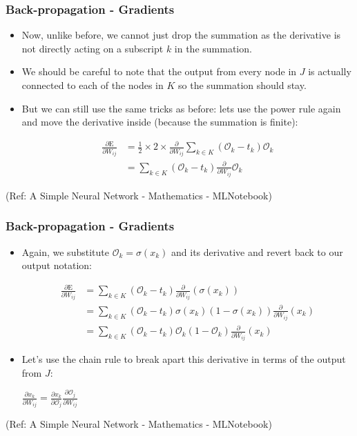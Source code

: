 \begin{frame}[fragile] \frametitle{Back-propagation - Gradients}

\begin{itemize}
\item Now, unlike before, we cannot just drop the summation as the derivative is not directly acting on a subscript $k$ in the 
summation. 
\item We should be careful to note that the output from every node in $J$ is actually connected to each of the nodes in $K$ 
so the summation should stay. 
\item But we can still use the same tricks as before: 
lets use the power rule again and move the derivative inside (because the summation is finite):

\begin{align}
\frac{\partial{\text{E}}}{\partial{W_{ij}}} &=  \frac{1}{2} \times 2 \times  \frac{\partial{}}{\partial{W_{ij}}}   \sum_{k \in K} \left( \mathcal{O}_{k} - t_{k} \right)  \mathcal{O}_{k} \\
&= \sum_{k \in K} \left( \mathcal{O}_{k} - t_{k} \right) \frac{\partial{}}{\partial{W_{ij}}} \mathcal{O}_{k}
 \end{align}
 
\end{itemize}

\tiny{(Ref: A Simple Neural Network - Mathematics - MLNotebook)}
\end{frame}

\begin{frame}[fragile] \frametitle{Back-propagation - Gradients}

\begin{itemize}
\item Again, we substitute $\mathcal{O}_{k} = \sigma( x_{k})$ and its derivative and revert back to our output notation:

\begin{align}
\frac{\partial{\text{E}}}{\partial{W_{ij}}} &= \sum_{k \in K} \left( \mathcal{O}_{k} - t_{k} \right) \frac{\partial{}}{\partial{W_{ij}}} (\sigma(x_{k}) )\\
&= \sum_{k \in K} \left( \mathcal{O}_{k} - t_{k} \right) \sigma(x_{k}) \left( 1 - \sigma(x_{k}) \right) \frac{\partial{}}{\partial{W_{ij}}} (x_{k}) \\
&= \sum_{k \in K} \left( \mathcal{O}_{k} - t_{k} \right) \mathcal{O}_{k} \left( 1 - \mathcal{O}_{k} \right) \frac{\partial{}}{\partial{W_{ij}}} (x_{k})
 \end{align}
 
\item Let’s use the chain rule to break apart this derivative in terms of the output from $J$:

$\frac{\partial{ x_{k}}}{\partial{W_{ij}}} = \frac{\partial{ x_{k}}}{\partial{\mathcal{O}_{j}}}\frac{\partial{\mathcal{O}_{j}}}{\partial{W_{ij}}}$

\end{itemize}

\tiny{(Ref: A Simple Neural Network - Mathematics - MLNotebook)}
\end{frame}


